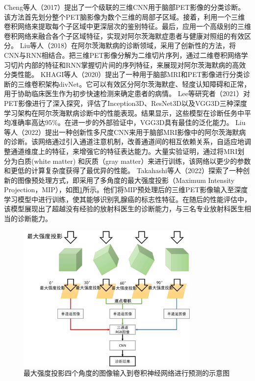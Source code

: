 Cheng等人\cite{cheng2017classification}（2017）提出了一个级联的三维CNN用于脑部PET影像的分类诊断。该方法首先划分整个PET脑影像为数个三维的局部子区域。接着，利用一个三维卷积网络来提取每个子区域中更深层次的鉴别特征。最后，应用一个高级别的三维卷积网络来融合各个子区域特征，实现对阿尔茨海默症患者与健康对照组的有效区分。
Liu等人\cite{liu2018classification}（2018）在阿尔茨海默病的诊断领域，采用了创新性的方法，将CNN与RNN相结合。把三维PET影像分解为二维切片序列，通过二维卷积网络学习切片内部的特征和RNN掌握切片间的序列特征，来展现对阿尔茨海默病的高效分类性能。
KHAGI等人\cite{khagi2020cnn}（2020）提出了一种用于脑部MRI和PET影像进行分类诊断的三维卷积架构divNet。它可以有效区分阿尔茨海默症、轻度认知障碍和正常，用于协助临床医生作为初步快速检测来确定患者的病情。
Lee等研究者\cite{lee2021performance}（2021）对PET影像进行了深入探究，评估了Inception3D、ResNet3D以及VGG3D三种深度学习架构在阿尔茨海默病诊断中的性能表现。结果显示，这些模型在诊断任务中平均准确率高达95\%。在进一步的外部验证中，VGG3D具有最佳的泛化能力。
Liu等人\cite{liu2022diagnosis}（2022）提出一种创新性多尺度CNN来用于脑部MRI影像中的阿尔茨海默病的诊断。该网络通过引入通道注意机制，改善通道间的相互依赖关系，自适应地调整通道维度上的特征，来增强它的特征表达能力。大量实验证明，通过将MRI划分为白质(white matter) 和灰质（gray matter）来进行训练，该网络以更少的参数和更低的计算复杂度获得了最优异的性能。
Takahashi等人\cite{takahashi2022deep}（2022）探索了一种创新的图像预处理方式，即采用了多角度的最大强度投影（Maximum Intensity Projection，MIP），如图\ref{fig:chap02_mip}所示。他们将MIP预处理后的三维PET影像输入至深度学习模型中进行训练，使其能够识别乳腺癌的标志性特征。在随后的性能评估中，该模型展现出了超越没有经验的放射科医生的诊断能力，与三名专业放射科医生相当的诊断能力。

\begin{figure}[htbp]
  \centering
  \includegraphics[width=0.8\textwidth]{figures/chap02_mip.jpg}
  \caption{最大强度投影四个角度的图像输入到卷积神经网络进行预测的示意图}
  \label{fig:chap02_mip}
\end{figure}

